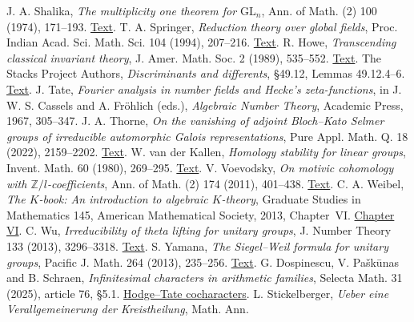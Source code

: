  J. A. Shalika, \emph{The multiplicity one theorem for $\mathrm{GL}_n$}, Ann. of Math. (2) 100 (1974), 171--193. \href{https://annals.math.princeton.edu/1974/100-2/p01}{Text}.
 T. A. Springer, \emph{Reduction theory over global fields}, Proc. Indian Acad. Sci. Math. Sci. 104 (1994), 207--216. \href{https://doi.org/10.1007/BF02830884}{Text}.
 R. Howe, \emph{Transcending classical invariant theory}, J. Amer. Math. Soc. 2 (1989), 535--552. \href{https://www.math.utah.edu/~ptrapa/math-library/howe/howe-transcending-1989.pdf}{Text}.
 The Stacks Project Authors, \emph{Discriminants and differents}, \S49.12, Lemmas 49.12.4--6. \href{https://stacks.math.columbia.edu/tag/0BWB}{Text}.
 J. Tate, \emph{Fourier analysis in number fields and Hecke's zeta-functions}, in J. W. S. Cassels and A. Fröhlich (eds.), \emph{Algebraic Number Theory}, Academic Press, 1967, 305--347.
 J. A. Thorne, \emph{On the vanishing of adjoint Bloch--Kato Selmer groups of irreducible automorphic Galois representations}, Pure Appl. Math. Q. 18 (2022), 2159--2202. \href{https://arxiv.org/pdf/2207.04925}{Text}.
 W. van der Kallen, \emph{Homology stability for linear groups}, Invent. Math. 60 (1980), 269--295. \href{https://webspace.science.uu.nl/~kalle101/homstab1980.pdf}{Text}.
 V. Voevodsky, \emph{On motivic cohomology with $\mathbb Z/l$-coefficients}, Ann. of Math. (2) 174 (2011), 401--438. \href{https://annals.math.princeton.edu/2011/174-1/p11}{Text}.
 C. A. Weibel, \emph{The $K$-book: An introduction to algebraic $K$-theory}, Graduate Studies in Mathematics 145, American Mathematical Society, 2013, Chapter~VI. \href{https://sites.math.rutgers.edu/~weibel/Kbook/Kbook.VI.pdf}{Chapter VI}.
 C. Wu, \emph{Irreducibility of theta lifting for unitary groups}, J. Number Theory 133 (2013), 3296--3318. \href{https://arxiv.org/abs/1409.0770}{Text}.
 S. Yamana, \emph{The Siegel--Weil formula for unitary groups}, Pacific J. Math. 264 (2013), 235--256. \href{https://doi.org/10.2140/pjm.2013.264.235}{Text}.
 G. Dospinescu, V. Pa\v{s}k\=unas and B. Schraen,
\emph{Infinitesimal characters in arithmetic families}, Selecta Math.
31 (2025), article 76, \S5.1.
\href{https://doi.org/10.1007/s00029-025-01045-6}{Hodge--Tate cocharacters}.
 L. Stickelberger,
\emph{Ueber eine Verallgemeinerung der Kreistheilung}, Math. Ann.
